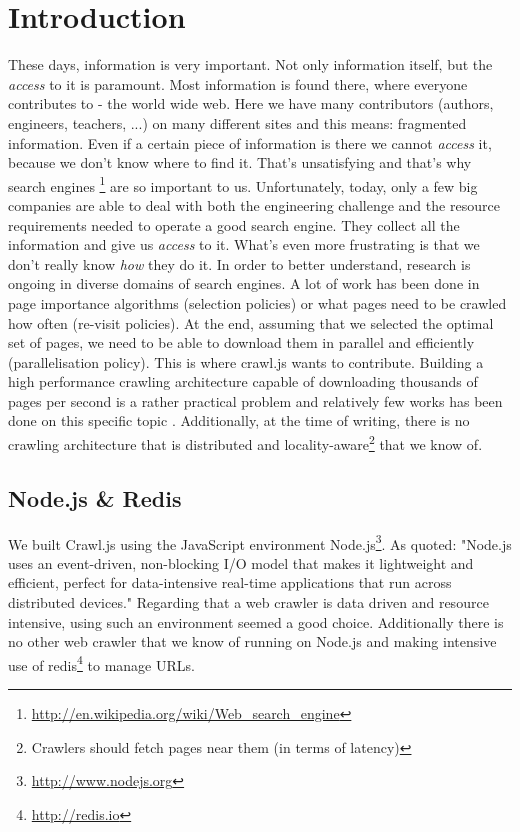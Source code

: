 
\chapter{Introduction} %

\label{Chapter1} %


These days, information is very important. Not only information itself, but the \emph{access} to it is paramount. Most information is found there, where everyone contributes to - the world wide web. Here we have many contributors (authors, engineers, teachers, ...) on many different sites and this means: fragmented information. Even if a certain piece of information is there we cannot \emph{access} it, because we don't know where to find it. That's unsatisfying and that's why search engines \footnote{\url{http://en.wikipedia.org/wiki/Web_search_engine}} are so important to us.
\newline
Unfortunately, today, only a few big companies are able to deal with both the engineering challenge and the resource requirements needed to operate a good search engine. They collect all the information and give us \emph{access} to it. What's even more frustrating is that we don't really know \emph{how} they do it. In order to better understand, research is ongoing in diverse domains of search engines.
\newline
A lot of work has been done in page importance algorithms (selection policies) or what pages need to be crawled how often (re-visit policies)\cite{page_importance1}\cite{page_importance2}. At the end, assuming that we selected the optimal set of pages, we need to be able to download them in parallel and efficiently (parallelisation policy). This is where crawl.js wants to contribute. Building a high performance crawling architecture capable of downloading thousands of pages per second is a rather practical problem and relatively few works has been done on this specific topic \cite{ubicrawler}\cite{hp_crawler}. Additionally, at the time of writing, there is no crawling architecture that is distributed and locality-aware\footnote{Crawlers should fetch pages near them (in terms of latency)} that we know of.

\section{Node.js \& Redis}
We built Crawl.js using the JavaScript environment Node.js\footnote{\url{http://www.nodejs.org}}. As quoted: "Node.js uses an event-driven, non-blocking I/O model that makes it lightweight and efficient, perfect for data-intensive real-time applications that run across distributed devices." Regarding that a web crawler is data driven and resource intensive, using such an environment seemed a good choice. Additionally there is no other web crawler that we know of running on Node.js and making intensive use of redis\footnote{\url{http://redis.io}} to manage URLs.

